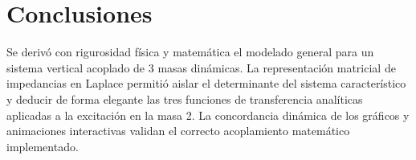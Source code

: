 \documentclass[12pt,letterpaper]{article}
\begin{document}
\section{Conclusiones}
Se derivó con rigurosidad física y matemática el modelado general para un sistema vertical acoplado de 3 masas dinámicas. La representación matricial de impedancias en Laplace permitió aislar el determinante del sistema característico y deducir de forma elegante las tres funciones de transferencia analíticas aplicadas a la excitación en la masa 2. La concordancia dinámica de los gráficos y animaciones interactivas validan el correcto acoplamiento matemático implementado.
\end{document}
